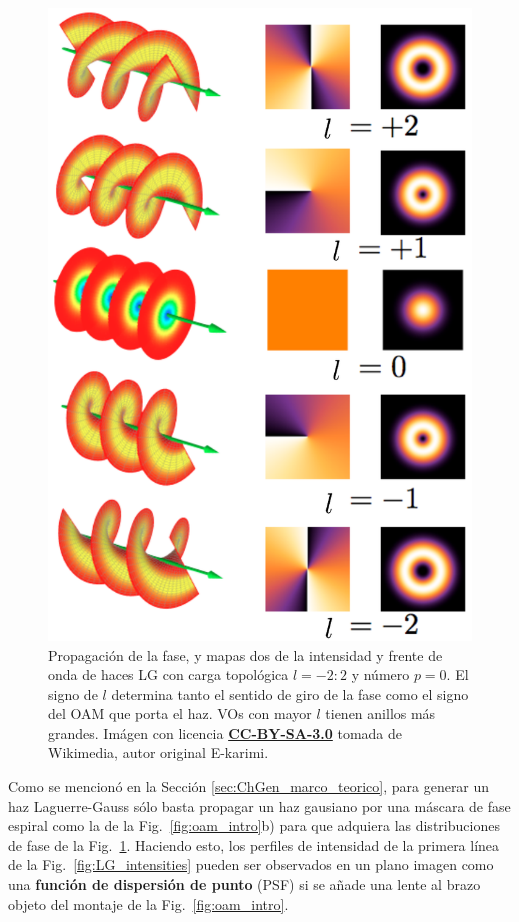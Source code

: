 \begin{figure}
\centering
\includegraphics[scale=0.5]{spirals.pdf}
\caption[Fase e intensidad de haces LG]{Propagación de la
  fase, y mapas dos de la intensidad y frente de onda de haces LG con
  carga topológica 
  $l=-2:2$ y número $p =0$. El signo de $l$ determina tanto el sentido
  de giro de la fase como el signo del OAM que porta el haz. VOs con
  mayor $l$ tienen anillos más grandes. Imágen con licencia
  \href{https://creativecommons.org/licenses/by-sa/3.0/}{\textbf{CC-BY-SA-3.0}}
    tomada de Wikimedia, autor original E-karimi.} 
\label{fig:spirals}
\end{figure}

Como se mencionó en la Sección \ref{sec:ChGen_marco_teorico}, para generar un haz
Laguerre-Gauss sólo basta propagar un haz gausiano por una máscara de
fase espiral como la de la Fig.~\ref{fig:oam_intro}b) para que
adquiera las distribuciones de fase de la
Fig.~\ref{fig:spirals}. Haciendo esto, los perfiles de
intensidad de la primera línea de la  Fig.~\ref{fig:LG_intensities}
pueden ser observados en un plano imagen como una \textbf{función de dispersión de punto} (\acrshort{PSF}) si se añade una lente
al brazo objeto del montaje de la Fig.~\ref{fig:oam_intro}.  

